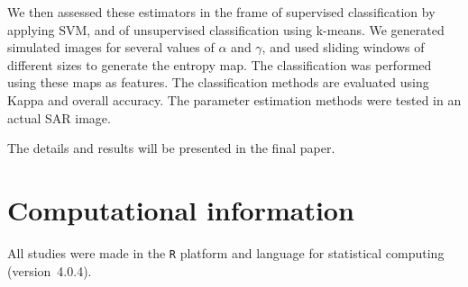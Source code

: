 \documentclass[journal]{IEEEtran}
\begin{document}
We then assessed these estimators in the frame of supervised classification by applying SVM, and of unsupervised classification using k-means. 
We generated simulated images for several values of $\alpha$ and $\gamma$, and used sliding windows of different sizes to generate the entropy map. 
The classification was performed using these maps as features. 
The classification methods are evaluated using Kappa and overall accuracy. 
The parameter estimation methods were tested in an actual SAR image. 

The details and results will be presented in the final paper.






\section{Computational information}
\label{conclusion}



All studies were made in the \texttt R platform and language for statistical computing~\cite{RLanguage} (version~4.0.4).




\end{document}
